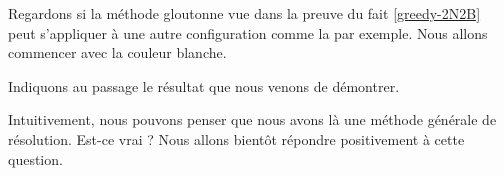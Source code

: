 Regardons si la méthode gloutonne vue dans la preuve du fait \ref{greedy-2N2B} peut s'appliquer à une autre configuration comme la  par exemple. Nous allons commencer avec la couleur blanche.

\begin{multicols}{2}
\begin{mvts}
    \medskip
    \item  {}

    \medskip
    \item  {}

    \medskip
    \item  {}

    \medskip
    \item  {}

    \medskip
    \item  {}

    \medskip
    \item  {}

    \medskip
    \item  {}

    \medskip
    \item  {}

    \medskip
    \item  {}

    \medskip
    \item  {}

    \medskip
    \item  {}

    \medskip
    \item  {}
\end{mvts}
\end{multicols}

Indiquons au passage le résultat que nous venons de démontrer.


 \label{greedy-3N2B}


\begin{remark}
    Intuitivement, nous pouvons penser que nous avons là une méthode générale de résolution.
    Est-ce vrai ? Nous allons bientôt répondre positivement à cette question.
\end{remark}
